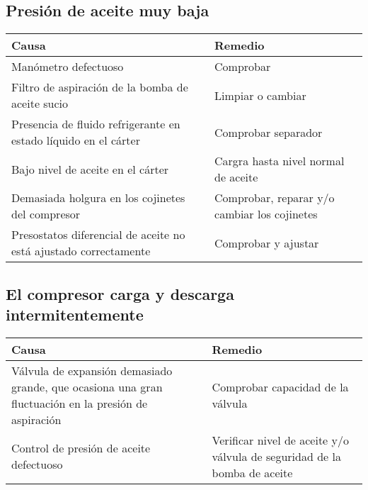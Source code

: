 \subsection{Presi\'on de aceite muy baja}

\begin{table}[H]
    \begin{center}
        \begin{tabular}{p{8cm} p{7cm}}
            \textbf{Causa} & \textbf{Remedio}\\ \hline
            Man\'ometro defectuoso & Comprobar\\
            Filtro de aspiraci\'on de la bomba de aceite sucio & Limpiar o cambiar\\
            Presencia de fluido refrigerante en estado l\'iquido en el c\'arter & Comprobar separador\\
            Bajo nivel de aceite en el c\'arter & Cargra hasta nivel normal de aceite\\
            Demasiada holgura en los cojinetes del compresor & Comprobar, reparar y/o cambiar los cojinetes\\
            Presostatos diferencial de aceite no est\'a ajustado correctamente & Comprobar y ajustar\\ \hline
        \end{tabular}
    \end{center}
\end{table}

\subsection{El compresor carga y descarga intermitentemente}

\begin{table}[H]
    \begin{center}
        \begin{tabular}{p{8cm} p{7cm}}
            \textbf{Causa} & \textbf{Remedio}\\ \hline
            V\'alvula de expansi\'on demasiado grande, que ocasiona una gran fluctuaci\'on en la presi\'on de aspiraci\'on & Comprobar capacidad de la v\'alvula\\
            Control de presi\'on de aceite defectuoso & Verificar nivel de aceite y/o v\'alvula de seguridad de la bomba de aceite\\ \hline
        \end{tabular}
    \end{center}
\end{table}